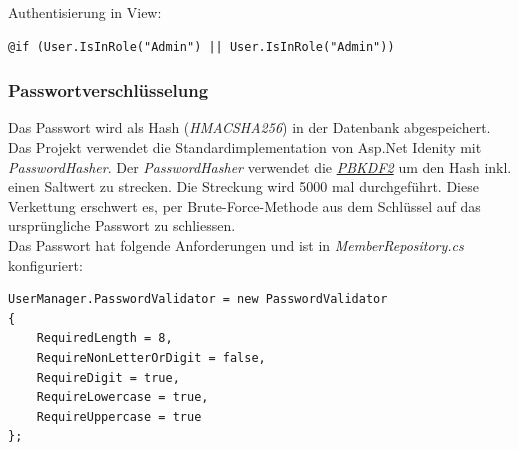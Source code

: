 			Authentisierung in View:
			\begin{lstlisting}[language=CSharp, caption=\_Layout.cshtml, label=lst:layoutauthentisierung, firstnumber=1]
@if (User.IsInRole("Admin") || User.IsInRole("Admin"))
			\end{lstlisting}

		\subsubsection{Passwortverschlüsselung}
		Das Passwort wird als Hash (\textit{HMACSHA256}) in der Datenbank abgespeichert. Das Projekt verwendet die Standardimplementation von Asp.Net Idenity mit \textit{PasswordHasher}. Der \textit{PasswordHasher} verwendet die \href{http://de.wikipedia.org/wiki/PBKDF2}{\textit{PBKDF2}} um den Hash inkl. einen Saltwert zu strecken. Die Streckung wird 5000 mal durchgeführt. Diese Verkettung erschwert es, per Brute-Force-Methode aus dem Schlüssel auf das ursprüngliche Passwort zu schliessen.
		\\ Das Passwort hat folgende Anforderungen und ist in \textit{MemberRepository.cs} konfiguriert:

		\begin{lstlisting}[language=CSharp, caption=MemberRepository.cs, label=lst:memberrepositorypassword, firstnumber=1]
UserManager.PasswordValidator = new PasswordValidator
{
    RequiredLength = 8,
    RequireNonLetterOrDigit = false,
    RequireDigit = true,
    RequireLowercase = true,
    RequireUppercase = true
};
		\end{lstlisting}